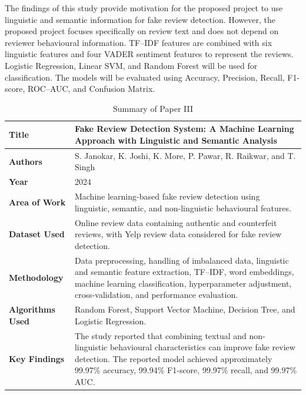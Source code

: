 \documentclass[12pt,a4paper]{report}
\begin{document}
The findings of this study provide motivation for the proposed project to use linguistic and semantic information for fake review detection. However, the proposed project focuses specifically on review text and does not depend on reviewer behavioural information. TF--IDF features are combined with six linguistic features and four VADER sentiment features to represent the reviews. Logistic Regression, Linear SVM, and Random Forest will be used for classification. The models will be evaluated using Accuracy, Precision, Recall, F1-score, ROC--AUC, and Confusion Matrix.

\begin{table}[H]
\centering
\small
\renewcommand{\arraystretch}{1.4}

\begin{tabularx}{0.95\textwidth}{|>{\raggedright\arraybackslash}p{}|X|}
\hline
\textbf{Title} &
Fake Review Detection System: A Machine Learning Approach with Linguistic and Semantic Analysis \\
\hline

\textbf{Authors} &
S. Janokar, K. Joshi, K. More, P. Pawar, R. Raikwar, and T. Singh \\
\hline

\textbf{Year} &
2024 \\
\hline

\textbf{Area of Work} &
Machine learning-based fake review detection using linguistic, semantic, and non-linguistic behavioural features. \\
\hline

\textbf{Dataset Used} &
Online review data containing authentic and counterfeit reviews, with Yelp review data considered for fake review detection. \\
\hline

\textbf{Methodology} &
Data preprocessing, handling of imbalanced data, linguistic and semantic feature extraction, TF--IDF, word embeddings, machine learning classification, hyperparameter adjustment, cross-validation, and performance evaluation. \\
\hline

\textbf{Algorithms Used} &
Random Forest, Support Vector Machine, Decision Tree, and Logistic Regression. \\
\hline

\textbf{Key Findings} &
The study reported that combining textual and non-linguistic behavioural characteristics can improve fake review detection. The reported model achieved approximately 99.97\% accuracy, 99.94\% F1-score, 99.97\% recall, and 99.97\% AUC. \\
\hline

\end{tabularx}

\caption{Summary of Paper III}
\label{tab:paper3}
\end{table}
\end{document}

